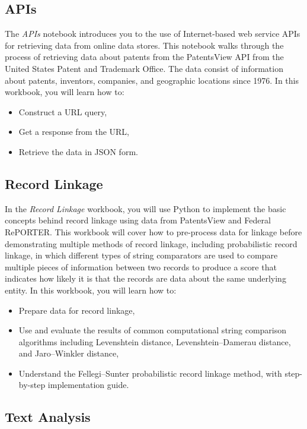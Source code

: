 \documentclass[]{krantz}
\begin{document}
\subsection{APIs}\label{apis}

The \emph{APIs} notebook introduces you to the use of Internet-based web
service APIs for retrieving data from online data stores. This notebook
walks through the process of retrieving data about patents from the
PatentsView API from the United States Patent and Trademark Office. The
data consist of information about patents, inventors, companies, and
geographic locations since 1976. In this workbook, you will learn how
to:

\begin{itemize}
\item
  Construct a URL query,
\item
  Get a response from the URL,
\item
  Retrieve the data in JSON form.
\end{itemize}

\subsection{Record Linkage}\label{record-linkage}

In the \emph{Record Linkage} workbook, you will use Python to implement
the basic concepts behind record linkage using data from PatentsView and
Federal RePORTER. This workbook will cover how to pre-process data for
linkage before demonstrating multiple methods of record linkage,
including probabilistic record linkage, in which different types of
string comparators are used to compare multiple pieces of information
between two records to produce a score that indicates how likely it is
that the records are data about the same underlying entity. In this
workbook, you will learn how to:

\begin{itemize}
\item
  Prepare data for record linkage,
\item
  Use and evaluate the results of common computational string comparison
  algorithms including Levenshtein distance, Levenshtein--Damerau
  distance, and Jaro--Winkler distance,
\item
  Understand the Fellegi--Sunter probabilistic record linkage method,
  with step-by-step implementation guide.
\end{itemize}

\subsection{Text Analysis}\label{text-analysis}
\end{document}
